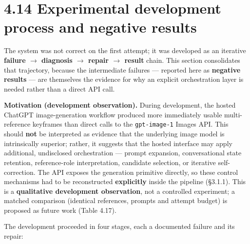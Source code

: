 \documentclass[10pt,twocolumn,letterpaper]{article}
\begin{document}
\section*{4.14 Experimental development process and negative results}

The system was not correct on the first attempt; it was developed as an iterative \textbf{failure $\rightarrow$ diagnosis $\rightarrow$ repair $\rightarrow$ result} chain. This section consolidates that trajectory, because the intermediate failures --- reported here as \textbf{negative results} --- are themselves the evidence for why an explicit orchestration layer is needed rather than a direct API call.

\textbf{Motivation (development observation).} During development, the hosted ChatGPT image-generation workflow produced more immediately usable multi-reference keyframes than direct calls to the \texttt{gpt-image-1} Images API. This should \textbf{not} be interpreted as evidence that the underlying image model is intrinsically superior; rather, it suggests that the hosted interface may apply additional, undisclosed orchestration --- prompt expansion, conversational state retention, reference-role interpretation, candidate selection, or iterative self-correction. The API exposes the generation primitive directly, so these control mechanisms had to be reconstructed \textbf{explicitly} inside the pipeline (\S{}3.1.1). This is a \textbf{qualitative development observation}, not a controlled experiment; a matched comparison (identical references, prompts and attempt budget) is proposed as future work (Table 4.17).

The development proceeded in four stages, each a documented failure and its repair:
\end{document}
